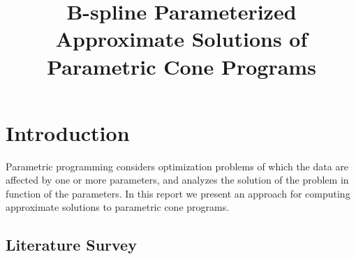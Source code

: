 \documentclass{article}
\begin{document}
\title{B-spline Parameterized Approximate Solutions of Parametric Cone Programs}%

\maketitle


\section{Introduction}

Parametric programming considers optimization problems of which the data are affected by one or more parameters, and analyzes the solution of the problem in function of the parameters. In this report we present an approach for computing approximate solutions to parametric cone programs.


\subsection{Literature Survey}
\end{document}
